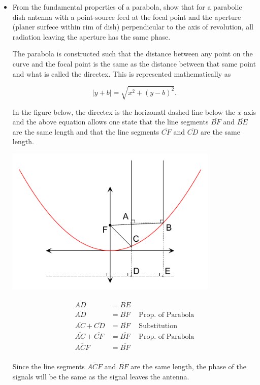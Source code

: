 \documentclass[letterpaper,10pt]{article}\usepackage[]{graphicx}\usepackage[]{color}
\newcommand{\question}[3]{
\begin{itemize}
\item[{\makebox[1cm]{#1)}}] #2

\vspace{.2in}

#3

\end{itemize}

\vspace{.2in}
}
\begin{document}
\question{2.13}{
From the fundamental properties of a parabola, show that for a parabolic dish antenna with a point-source feed at the focal point and the aperture (planer surfece within rim of dish) perpendicular to the axis of revolution, all radiation leaving the aperture has the same phase.
}{

The parabola is constructed such that the distance between any point on the curve and the focal point is the same as the distance between that same point and what is called the directex.  This is represented mathematically as

\begin{equation*}
|y+b| = \sqrt{x^2 + (y-b)^2}\text{.}
\end{equation*}

In the figure below, the directex is the horizonatl dashed line below the $x$-axis and the above equation allows one state that the line segments $\overline{BF}$ and $\overline{BE}$ are the same length and that the line segments $\overline{CF}$ and $\overline{CD}$ are the same length.

\begin{center}
\includegraphics[width=4in]{Figures/HW2_2_13__1.pdf}
\end{center}

\begin{align*}
\overline{AD} & = \overline{BE} & \\
\overline{AD} & = \overline{BF} & \text{ Prop. of Parabola} \\
\overline{AC} + \overline{CD} & = \overline{BF} & \text{ Substitution} \\
\overline{AC} + \overline{CF} & = \overline{BF} & \text{ Prop. of Parabola} \\
\overline{ACF} & = \overline{BF} & \\
\end{align*}

Since the line segments $\overline{ACF}$ and $\overline{BF}$ are the same length, the phase of the signals will be the same as the signal leaves the antenna.


}
\end{document}

